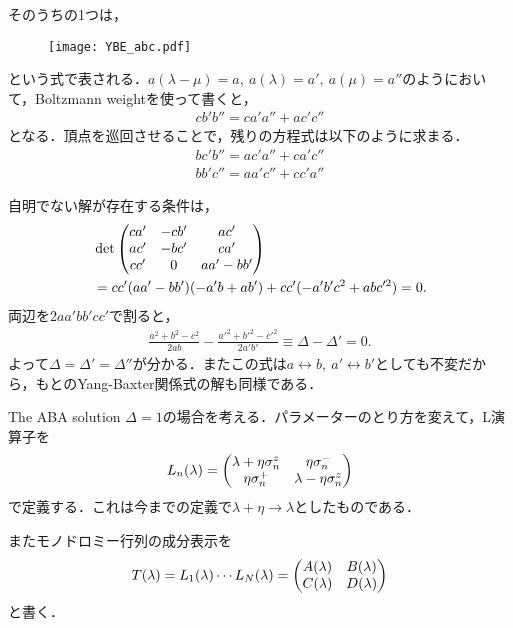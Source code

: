 \documentclass[dvipdfmx,9pt]{beamer}
\numberwithin{equation}{section}
\begin{document}
\begin{frame}
    そのうちの1つは，
    \begin{figure}[H]
        \centering
        \texttt{[image: YBE\_abc.pdf]}
    \end{figure}
    という式で表される．$a(\lambda-\mu) = a,~ a(\lambda) = a',~ a(\mu) = a''$のようにおいて，Boltzmann weightを使って書くと，
    \begin{align}
        cb'b'' = ca'a'' + ac'c''
    \end{align}
    となる．頂点を巡回させることで，残りの方程式は以下のように求まる．
    \begin{align}
        bc'b'' = ac'a'' + ca'c''\\
        bb'c'' = aa'c'' + cc'a''
    \end{align}
\end{frame}

\begin{frame}{}
    自明でない解が存在する条件は，
    \begin{align*}
        &
        \det \mqty(
            ca' & -cb' & ac' \\
            ac' & -bc' & ca' \\
            cc' & 0    & aa'-bb'
        )
        \\ &
        = cc'(aa'-bb')(-a'b+ab') + cc'(-a'b'c^2+abc'^2)
        = 0.
    \end{align*}
    両辺を$2aa'bb'cc'$で割ると，
    \begin{align}
        \frac{a^2+b^2-c^2}{2ab} - \frac{a'^2+b'^2-c'^2}{2a'b'} \equiv \Delta - \Delta' = 0.
    \end{align}
    よって$\Delta = \Delta' = \Delta''$が分かる．またこの式は$a \leftrightarrow  b,~ a' \leftrightarrow b'$としても不変だから，もとのYang-Baxter関係式の解も同様である．
\end{frame}

\begin{frame}{The ABA solution}
    $\Delta = 1$の場合を考える．パラメーターのとり方を変えて，L演算子を
    \begin{align}
        L_n(\lambda) = 
        \mqty(
            \lambda + \eta\sigma_n^z & \eta\sigma_n^- \\
            \eta\sigma_n^+ & \lambda - \eta\sigma_n^z
        )
    \end{align}
    で定義する．これは今までの定義で$\lambda + \eta \to \lambda$としたものである．

    またモノドロミー行列の成分表示を
    \begin{align}
        T(\lambda) = L_1(\lambda) \cdots L_N(\lambda) = \mqty(A(\lambda)&B(\lambda)\\C(\lambda)&D(\lambda)) 
    \end{align}
    と書く．
\end{frame}
\end{document}
